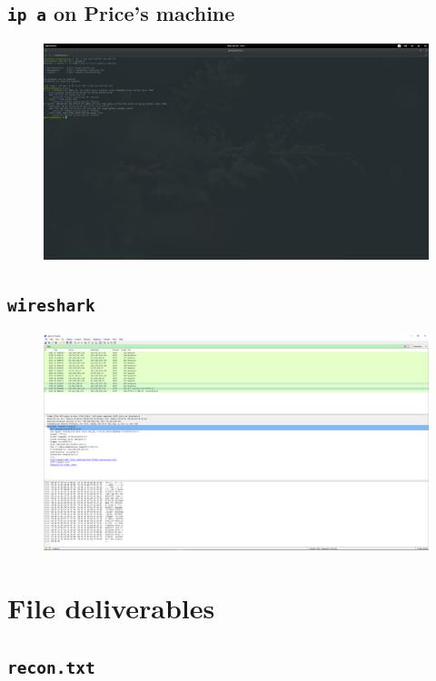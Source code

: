 \documentclass[12pt]{report}
\begin{document}
\section{\texttt{ip a} on Price's machine}
\label{app:screenshots:6}
\begin{figure}[H]
  \centering
  \includegraphics[width=0.7\paperheight, angle=-90]{It's_Elementary_my_dear_Watson!-2017-12-20-16-17-51}
\end{figure}
\section{\texttt{wireshark}}
\label{app:screenshots:7}
\begin{figure}[H]
  \centering
  \includegraphics[width=0.7\paperheight, angle=-90]{wireshark}
\end{figure}

\pagebreak
\chapter{File deliverables}
\section{\texttt{recon.txt}}
\label{app:files:recon}

\end{document}
